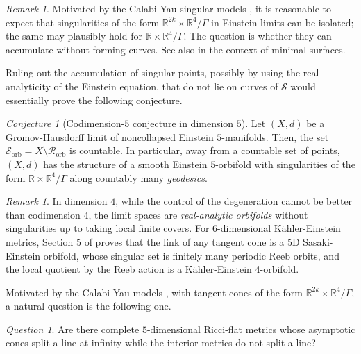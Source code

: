 \documentclass[11pt,reqno]{amsart}
\numberwithin{equation}{section}
\theoremstyle{definition}
\theoremstyle{remark}
\newtheorem{remark}[thm]{Remark}
\newtheorem{conjecture}[thm]{Conjecture}
\newtheorem{question}[thm]{Question}
\begin{document}
\begin{remark}
Motivated by the Calabi-Yau singular models \cite{hn,sze19}, it is reasonable to expect that singularities of the form $\mathbb{R}^{2k}\times\mathbb{R}^4/\Gamma$ in Einstein limits can be isolated; the same may plausibly hold for $\mathbb{R}\times\mathbb{R}^4/\Gamma$. The question is whether they can accumulate without forming curves. See also \cite{sze21} in the context of minimal surfaces.
\end{remark}

Ruling out the accumulation of singular points, possibly by using the real-analyticity of the Einstein equation, that do not lie on curves of $\mathcal{S}$ would essentially prove the following conjecture.

\begin{conjecture}[Codimension-$5$ conjecture in dimension $5$]\label{conj:codim5 dim 5}
    Let $(X,d)$ be a Gromov-Hausdorff limit of noncollapsed Einstein $5$-manifolds. Then, the set $\mathcal{S}_{\mathrm{orb}}=X\setminus\mathcal{R}_{\mathrm{orb}}$ is countable. In particular, away from a countable set of points, $(X,d)$ has the structure of a smooth Einstein $5$-orbifold with singularities of the form $\mathbb{R}\times \mathbb{R}^4/\Gamma$ along countably many \emph{geodesics}. 
\end{conjecture}

\begin{remark}
     In dimension $4$, while the control of the degeneration cannot be better than codimension $4$, the limit spaces are \textit{real-analytic orbifolds} without singularities up to taking local finite covers. For $6$-dimensional Kähler-Einstein metrics, Section 5 of \cite{DS} proves that the link of any tangent cone is a 5D Sasaki-Einstein orbifold, whose singular set is finitely many periodic Reeb orbits, and the local quotient by the Reeb action is a Kähler-Einstein 4-orbifold.
\end{remark}




Motivated by the Calabi-Yau models \cite{li19,cr23,sze19,sze20}, with tangent cones of the form $\mathbb{R}^{2k}\times\mathbb{R}^4/\Gamma$, a natural question is the following one.

\begin{question}
    Are there complete $5$-dimensional Ricci-flat metrics whose asymptotic cones split a line at infinity while the interior metrics do not split a line?
\end{question}
 
\end{document}
